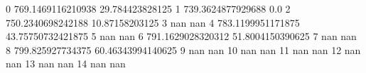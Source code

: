 0 769.1469116210938 29.784423828125
1 739.3624877929688 0.0
2 750.2340698242188 10.87158203125
3 nan nan
4 783.1199951171875 43.75750732421875
5 nan nan
6 791.1629028320312 51.8004150390625
7 nan nan
8 799.825927734375 60.46343994140625
9 nan nan
10 nan nan
11 nan nan
12 nan nan
13 nan nan
14 nan nan
